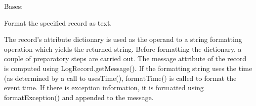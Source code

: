 \documentclass[a4paper,10pt,english]{sphinxmanual}
\begin{document}
\begin{fulllineitems}
\label{\detokenize{apidoc_src/src:src.loggingSat.UnittestFormatter}}
Bases: 

\begin{fulllineitems}
\label{\detokenize{apidoc_src/src:src.loggingSat.UnittestFormatter.format}}
Format the specified record as text.

The record’s attribute dictionary is used as the operand to a
string formatting operation which yields the returned string.
Before formatting the dictionary, a couple of preparatory steps
are carried out. The message attribute of the record is computed
using LogRecord.getMessage(). If the formatting string uses the
time (as determined by a call to usesTime(), formatTime() is
called to format the event time. If there is exception information,
it is formatted using formatException() and appended to the message.

\end{fulllineitems}


\end{fulllineitems}

\end{document}
